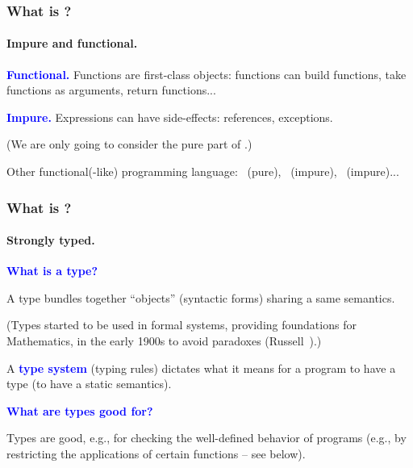 \documentclass[12pt,red]{beamer}
\newcommand{\cemph}[1]{\textcolor{blue}{\textbf{#1}}}
\begin{document}
\begin{frame}
  \frametitle{What is \ML?}

  \framesubtitle{Impure and functional.}

  \cemph{Functional.}
  Functions are first-class objects: functions can build
  functions, take functions as arguments, return functions...

  \vspace{0.4in}

  \cemph{Impure.}
  Expressions can have side-effects: references, exceptions.

  \vspace{0.1in}

  (We are only going to consider the pure part of \ML.)

  \vspace{0.4in}

  Other functional(-like) programming language: \haskell\ (pure),
  \SML\ (impure), \fsharp\ (impure)...
\end{frame}


\begin{frame}
  \frametitle{What is \ML?}

  \framesubtitle{Strongly typed.}

  \cemph{What is a type?}

  \vspace{0.07in}

  A type bundles together ``objects'' (syntactic forms) sharing a same semantics.

  \vspace{0.1in}

  (Types started to be used in formal systems, providing foundations
  for Mathematics, in the early 1900s to avoid paradoxes
  (Russell~\cite{Russell:1908}).)

  \vspace{0.1in}

  A \cemph{type system} (typing rules) dictates what it means for a
  program to have a type (to have a static semantics).

  \vspace{0.15in}

  \cemph{What are types good for?}

  \vspace{0.07in}

  Types are good, e.g., for checking the well-defined behavior of programs
  (e.g., by restricting the applications of certain functions -- see
  below).
\end{frame}
\end{document}
